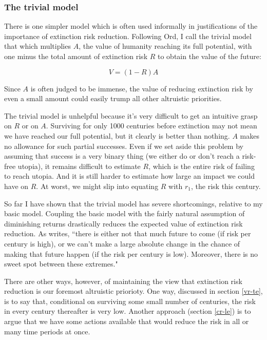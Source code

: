 \documentclass[british]{article}
\begin{document}
\subsubsection{The trivial model}\label{header-n93}
There is one simpler model which is often used informally in justifications of
the importance of extinction risk reduction. Following Ord, I call the trivial model that which multiplies \(A\), the value of humanity reaching its full potential, with one minus the total amount of extinction risk \(R\) to obtain the value of the future:

\[V=(1-R)A\]

Since \(A\) is often judged to be immense, the value of reducing extinction risk by even a small amount could easily trump all other altruistic priorities.

The trivial model is unhelpful because it's very difficult to get an intuitive grasp on $R$ or on $A$. Surviving for only 1000 centuries before extinction may not mean we have reached our full potential, but it clearly is better than nothing. $A$ makes no allowance for such partial successes. Even if we set aside this problem by assuming that success is a very binary thing (we either do or don't reach a risk-free utopia), it remains difficult to estimate $R$, which is the entire risk of failing to reach utopia. And it is still harder to estimate how large an impact we could have on $R$. At worst, we might slip into equating $R$ with $r_1$, the risk this century.

So far I have shown that the trivial model has severe shortcomings, relative to my basic model. Coupling the basic model with the fairly natural
assumption of diminishing returns drastically reduces
the expected value of extinction risk reduction. As \cite{ord_modelling_2014} writes, ``there is either not that much future to come (if risk per century is high), or we can’t make a large absolute change in the chance of making that future happen (if the risk per century is low). Moreover, there is no sweet spot between these extremes."

There are other ways, however, of maintaining the view that extinction risk reduction is our foremost altruistic priorioty. One way,
discussed in section \ref{vr-te}, is to say that, conditional on surviving some small number of
centuries, the risk in every century thereafter is very low. Another
approach (section \ref{cr-le}) is to argue that we have some actions available that would
reduce the risk in all or many time periods at once.
\end{document}
